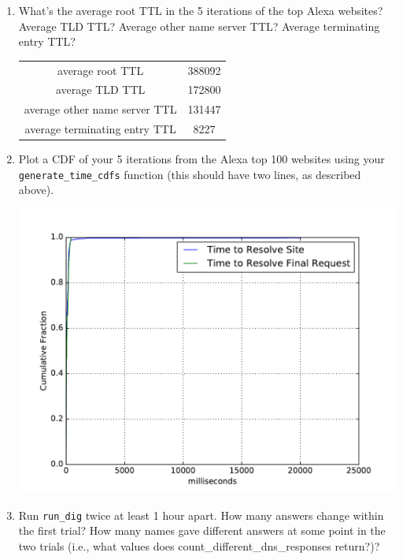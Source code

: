 \documentclass[10pt]{article}
\begin{document}
\begin{enumerate}

\item What's the average root TTL in the 5 iterations of the top Alexa websites? Average TLD TTL? Average other name server TTL? Average terminating entry TTL?

\begin{center}
\begin{tabular}{|| c | c ||}
\hline
average root TTL & 388092 \\
average TLD TTL & 172800 \\
average other name server TTL & 131447 \\
average terminating entry TTL & 8227 \\
\hline
\end{tabular}
\end{center}

\item Plot a CDF of your 5 iterations from the Alexa top 100 websites using your \texttt{generate\_time\_cdfs} function (this should have two lines, as described above).

\begin{center}
\includegraphics[scale=0.5]{dns_output_1}
\end{center}

\item Run \texttt{run\_dig} twice at least 1 hour apart. How many answers change within the first trial? How many names gave different answers at some point in the two trials (i.e., what values does {count\_different\_dns\_responses} return?)?


\end{enumerate}
\end{document}
